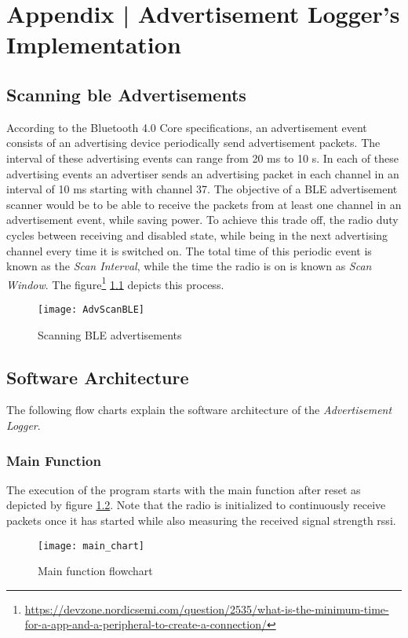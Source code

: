 \chapter{Appendix | Advertisement Logger's Implementation} \label{ApdxAdvLog}

\section{Scanning \gls{ble} Advertisements}

According to the Bluetooth 4.0 Core specifications, an advertisement event consists of an advertising device periodically send advertisement packets. The interval of these advertising events can range from 20 ms to 10 s. In each of these advertising events an advertiser sends an advertising packet in each channel in an interval of 10 ms starting with channel 37. The objective of a BLE advertisement scanner would be to be able to receive the packets from at least one channel in an advertisement event, while saving power. To achieve this trade off, the radio duty cycles between receiving and disabled state, while being in the next advertising channel every time it is switched on. The total time of this periodic event is known as the \emph{Scan Interval}, while the time the radio is on is known as \emph{Scan Window}. The figure\footnote{\href{https://devzone.nordicsemi.com/question/2535/what-is-the-minimum-time-for-a-app-and-a-peripheral-to-create-a-connection/}{https://devzone.nordicsemi.com/question/2535/what-is-the-minimum-time-for-a-app-and-a-peripheral-to-create-a-connection/}} \ref{fig:AdvScanBLE} depicts this process.

\begin{figure}[h]
\centering
\texttt{[image: AdvScanBLE]}
\caption{Scanning BLE advertisements}
\label{fig:AdvScanBLE}
\end{figure}

\section{Software Architecture}
The following flow charts explain the software architecture of the \emph{Advertisement Logger}.
\subsection{Main Function}
The execution of the program starts with the main function after reset as depicted by figure \ref{fig:main_chart}. Note that the radio is initialized to continuously receive packets once it has started while also measuring the received signal strength \acrshort{rssi}.
\begin{figure}[h]
\centering
\vspace{80pt}
\texttt{[image: main\_chart]}
\caption{Main function flowchart}
\vspace{80pt}
\label{fig:main_chart}
\end{figure}

